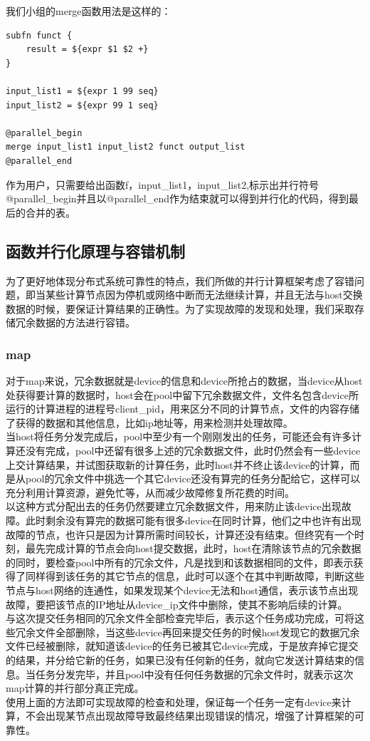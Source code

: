 \documentclass[paper=a4]{ctexart} %
\numberwithin{equation}{section} %
\numberwithin{figure}{section} %
\numberwithin{table}{section} %
\newcommand{\n}{\\\indent}
\begin{document}
我们小组的merge函数用法是这样的：

\begin{lstlisting}[language=shell]
subfn funct {
    result = ${expr $1 $2 +}
}

input_list1 = ${expr 1 99 seq}
input_list2 = ${expr 99 1 seq}

@parallel_begin
merge input_list1 input_list2 funct output_list
@parallel_end
\end{lstlisting}

作为用户，只需要给出函数f，input\_list1，input\_list2,标示出并行符号@parallel\_begin并且以@parallel\_end作为结束就可以得到并行化的代码，得到最后的合并的表。

\subsection{函数并行化原理与容错机制}
    为了更好地体现分布式系统可靠性的特点，我们所做的并行计算框架考虑了容错问题，即当某些计算节点因为停机或网络中断而无法继续计算，并且无法与host交换数据的时候，要保证计算结果的正确性。为了实现故障的发现和处理，我们采取存储冗余数据的方法进行容错。

\subsubsection{map}
 对于map来说，冗余数据就是device的信息和device所抢占的数据，当device从host处获得要计算的数据时，host会在pool中留下冗余数据文件，文件名包含device所运行的计算进程的进程号client\_pid，用来区分不同的计算节点，文件的内容存储了获得的数据和其他信息，比如ip地址等，用来检测并处理故障。\n
    当host将任务分发完成后，pool中至少有一个刚刚发出的任务，可能还会有许多计算还没有完成，pool中还留有很多上述的冗余数据文件，此时仍然会有一些device上交计算结果，并试图获取新的计算任务，此时host并不终止该device的计算，而是从pool的冗余文件中挑选一个其它device还没有算完的任务分配给它，这样可以充分利用计算资源，避免忙等，从而减少故障修复所花费的时间。\n
    以这种方式分配出去的任务仍然要建立冗余数据文件，用来防止该device出现故障。此时剩余没有算完的数据可能有很多device在同时计算，他们之中也许有出现故障的节点，也许只是因为计算所需时间较长，计算还没有结束。但终究有一个时刻，最先完成计算的节点会向host提交数据，此时，host在清除该节点的冗余数据的同时，要检查pool中所有的冗余文件，凡是找到和该数据相同的文件，即表示获得了同样得到该任务的其它节点的信息，此时可以逐个在其中判断故障，判断这些节点与host网络的连通性，如果发现某个device无法和host通信，表示该节点出现故障，要把该节点的IP地址从device\_ip文件中删除，使其不影响后续的计算。\n
    与这次提交任务相同的冗余文件全部检查完毕后，表示这个任务成功完成，可将这些冗余文件全部删除，当这些device再回来提交任务的时候host发现它的数据冗余文件已经被删除，就知道该device的任务已被其它device完成，于是放弃掉它提交的结果，并分给它新的任务，如果已没有任何新的任务，就向它发送计算结束的信息。当任务分发完毕，并且pool中没有任何任务数据的冗余文件时，就表示这次map计算的并行部分真正完成。\n
    使用上面的方法即可实现故障的检查和处理，保证每一个任务一定有device来计算，不会出现某节点出现故障导致最终结果出现错误的情况，增强了计算框架的可靠性。
\end{document}
